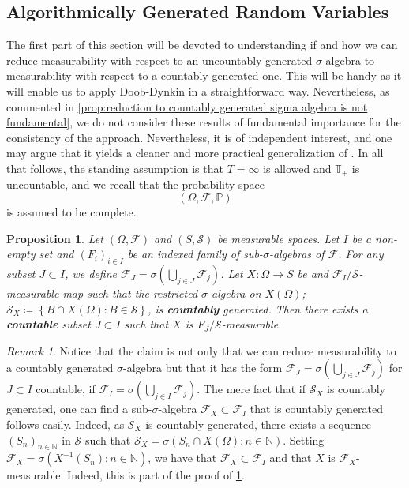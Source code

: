 \documentclass[11pt,a4paper,twoside,openany]{report}
\theoremstyle{plain} %
\newtheorem{proposition}[proposition]{Proposition}
\theoremstyle{definition} %
\theoremstyle{remark} %
\newtheorem{remark}[remark]{Remark}
\let\parencite\authnumparencite
\begin{document}
 \subsection{Algorithmically Generated Random Variables}\label{sec:algorithmically generated random variables}
 The first part of this section will be devoted to understanding if and how we can reduce measurability with respect to an uncountably generated \(\sigma\)-algebra to measurability with respect to a countably generated one. This will be handy as it will enable us to apply Doob-Dynkin in a straightforward way. Nevertheless, as commented in \cref{prop:reduction to countably generated sigma algebra is not fundamental}, we do not consider these results of fundamental importance for the consistency of the approach. Nevertheless, it is of independent interest, and one may argue that it yields a cleaner and more practical generalization of \parencite{Buehler2018DeepHedging}.
 \bigbreak
 In all that follows, the standing assumption is that \(T=\infty\) is allowed and \(\mathbb{T}_+\) is uncountable, and we recall that the probability space 
 \begin{equation}
     (\Omega,\mathcal{F},\mathbb{P})
 \end{equation}
 is assumed to be complete.
 \begin{proposition}\label{prop:reduction to countable measurability}
     Let \((\Omega,\mathcal{F})\) and \((S,\mathcal{S})\) be measurable spaces. Let \(I\) be a non-empty set and \((F_i)_{i\in I}\) be an indexed family of sub-\(\sigma\)-algebras of \(\mathcal{F}\). For any subset \(J\subset I\), we define \(\mathcal{F}_J=\sigma(\bigcup_{j\in J}\mathcal{F}_j)\). Let \(X:\Omega\to S\) be and \(\mathcal{F}_I/\mathcal
     S\)-measurable map such that the restricted \(\sigma\)-algebra on \(X(\Omega)\); \(\mathcal{S}_X\coloneqq\left\{B\cap X(\Omega):B\in \mathcal{S}\right\}\), is \textbf{countably} generated. Then there exists a \textbf{countable} subset \(J\subset I\) such that \(X\) is \(F_{J}/\mathcal{S}\)-measurable. 
 \end{proposition}
 \begin{remark}\label{Remark:countably generated sigma algebra}
      Notice that the claim is not only that we can reduce measurability to a countably generated \(\sigma\)-algebra but that it has the form \(\mathcal{F}_J=\sigma(\bigcup_{j\in J}\mathcal{F}_j)\) for \(J\subset I\) countable, if \(\mathcal{F}_I=\sigma(\bigcup_{j\in I}\mathcal{F}_j)\). The mere fact that if \(\mathcal{S}_X\) is countably generated, one can find a sub-\(\sigma\)-algebra \(\mathcal{F}_X\subset\mathcal{F}_I\) that is countably generated follows easily. Indeed, as \(\mathcal{S}_X\) is countably generated, there exists a sequence \((S_n)_{n\in\mathbb{N}}\) in \(\mathcal{S}\) such that \(\mathcal{S}_X=\sigma(S_n\cap X(\Omega):n\in\mathbb{N})\). Setting 
 \(\mathcal{F}_X=\sigma(X^{-1}(S_n):n\in\mathbb{N})\), we have that \(\mathcal{F}_X\subset\mathcal{F}_I\) and that \(X\) is \(\mathcal{F}_X\)-measurable. Indeed, this is part of the proof of \cref{prop:reduction to countable measurability}. 
 \end{remark}
\end{document}
